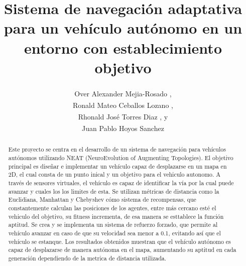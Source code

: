 \documentclass[conference]{IEEEtran}
\begin{document}
\title{Sistema de navegación adaptativa para un vehículo autónomo en un entorno con establecimiento objetivo}


\author{Over Alexander Mejia-Rosado \textsuperscript{\href{https://orcid.org/0009-0008-8152-2754}{\textcolor{orcidcolor}{\faOrcid}}}, 

Ronald Mateo Ceballos Lozano \textsuperscript{\href{https://orcid.org/0009-0003-6478-3286}{\textcolor{orcidcolor}{\faOrcid}}}, 

Rhonald José Torres Diaz \textsuperscript{\href{mailto:rhtorresd@unal.edu.co}{\textcolor{orcidcolor}{}}}, y\\

Juan Pablo Hoyos Sanchez \textsuperscript{\href{mailto:jhoyoss@unal.edu.co}{\textcolor{orcidcolor}{}}}
}

\maketitle

\begin{abstract}
Este proyecto se centra en el desarrollo de un sistema de navegación para vehículos autónomos utilizando NEAT (NeuroEvolution of Augmenting Topologies). El objetivo principal es diseñar e implementar un vehículo capaz de desplazarse en un mapa en 2D, el cual consta de un punto inical y un objetivo para el vehiculo autonomo. A través de sensores virtuales, el vehículo es capaz de identificar la vía por la cual puede avanzar y cuales los los limites de esta. Se utilizan métricas de distancia como la Euclidiana, Manhattan y Chebyshev cómo sistema de recompensas, que constantemente calculan las posiciones de los agentes, entre más cercano esté el vehiculo del objetivo, su fitness incrementa, de esa manera se esttablece la función aptitud. Se crea y se implementa un sistema de refuerzo forzado, que permite al vehículo avanzar en caso de que su velocidad sea menor a 0.1, evitando así que el vehículo se estanque. Los resultados obtenidos muestran que el vehículo autónomo es capaz de desplazarse de manera autónoma en el mapa, aumentando su aptitud en cada generación dependiendo de la metrica de distancia utilizada.
\end{abstract}
\end{document}
